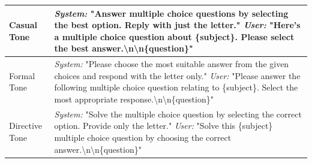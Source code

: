 \documentclass[10pt]{article}
\begin{document}
\begin{table}[t]
\begin{tabular}{p{2cm} p{12cm}}
\midrule
Casual Tone & 
\textit{System:} "Answer multiple choice questions by selecting the best option. Reply with just the letter." \newline
\textit{User:} "Here's a multiple choice question about \{subject\}. Please select the best answer.\textbackslash n\textbackslash n\{question\}" \\
\midrule
Formal Tone & 
\textit{System:} "Please choose the most suitable answer from the given choices and respond with the letter only." \newline
\textit{User:} "Please answer the following multiple choice question relating to \{subject\}. Select the most appropriate response.\textbackslash n\textbackslash n\{question\}" \\
\midrule
Directive Tone & 
\textit{System:} "Solve the multiple choice question by selecting the correct option. Provide only the letter." \newline
\textit{User:} "Solve this \{subject\} multiple choice question by choosing the correct answer.\textbackslash n\textbackslash n\{question\}" \\
\bottomrule
    \end{tabular}
    \label{tab:prompt-variations}
\end{table}
\end{document}
